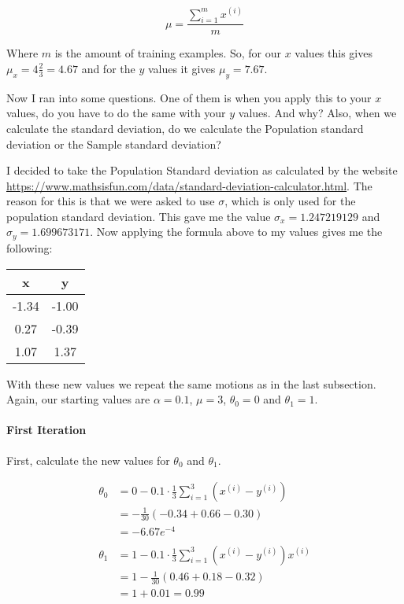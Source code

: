 \documentclass[12pt, a4paper]{article}
\begin{document}
\begin{equation*}
\mu = \frac{\sum\limits_{i=1}^m x^{(i)}}{m}
\end{equation*}

Where $m$ is the amount of training examples. So, for our $x$ values this gives $\mu_x = 4\frac{2}{3} = 4.67$ and for the $y$ values it gives $\mu_y = 7.67$.

Now I ran into some questions. One of them is when you apply this to your $x$ values, do you have to do the same with your $y$ values. And why?
Also, when we calculate the standard deviation, do we calculate the Population standard deviation or the Sample standard deviation?

I decided to take the Population Standard deviation as calculated by the website \url{https://www.mathsisfun.com/data/standard-deviation-calculator.html}. 
The reason for this is that we were asked to use $\sigma$, which is only used for the population standard deviation.
This gave me the value $\sigma_x = 1.247219129$ and $\sigma_y = 1.699673171$. Now applying the formula above to my values gives me the following:

\begin{table}[h!]
\centering
\begin{tabular}{c|c}
   x & y \\
   \hline
   -1.34 & -1.00\\
   0.27 & -0.39\\
   1.07 & 1.37
\end{tabular}
\end{table}

With these new values we repeat the same motions as in the last subsection. Again, our starting values are $\alpha = 0.1$, $\mu = 3$, $\theta_0 = 0$ and $\theta_1=1$.

\pagebreak

\paragraph{First Iteration}
	First, calculate the new values for $\theta_0$ and $\theta_1$.
	
		\begin{align*}
		\theta_0 &= 0 - 0.1 \cdot \frac{1}{3}\sum\limits_{i=1}^3 (x ^{(i)} - y ^{(i)})\\
		&= -\frac{1}{30} (-0.34+0.66-0.30)\\
		&=- 6.67e^{-4} \\
		\\
		\theta_1&=1-0.1 \cdot \frac{1}{3}\sum\limits_{i=1}^3 (x ^{(i)} - y ^{(i)})x^{(i)}\\
		&=1-\frac{1}{30}(0.46+0.18-0.32)\\
		&=1+0.01=0.99
		\end{align*}
		
\end{document}
